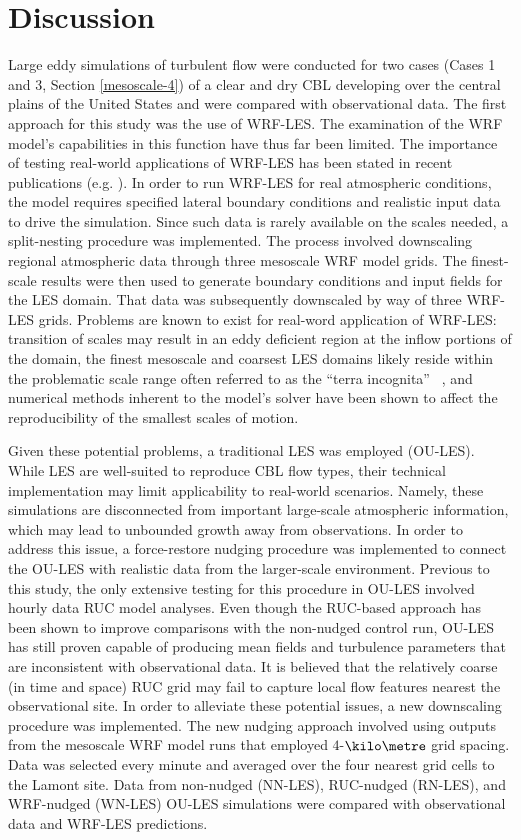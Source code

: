 \section{Discussion}
\label{dis-64}

Large eddy simulations of turbulent flow were conducted for two cases (Cases 1 and 3, Section \autoref{mesoscale-4}) of a clear and dry CBL developing over the central plains of the United States and were compared with observational data. The first approach for this study was the use of WRF-LES. The examination of the WRF model's capabilities in this function have thus far been limited. The importance of testing real-world applications of WRF-LES has been stated in recent publications (e.g. \citealt{Talbot2012}). In order to run WRF-LES for real atmospheric conditions, the model requires specified lateral boundary conditions and realistic input data to drive the simulation. Since such data is rarely available on the scales needed, a split-nesting procedure was implemented. The process involved downscaling regional atmospheric data through three mesoscale WRF model grids. The finest-scale results were then used to generate boundary conditions and input fields for the LES domain. That data was subsequently downscaled by way of three WRF-LES grids. Problems are known to exist for real-word application of WRF-LES: transition of scales may result in an eddy deficient region at the inflow portions of the domain, the finest mesoscale and coarsest LES domains likely reside within the problematic scale range often referred to as the ``terra incognita'' ~\citep{Wyngaard2004}, and numerical methods inherent to the model's solver have been shown to affect the reproducibility of the smallest scales of motion.

Given these potential problems, a traditional LES was employed (OU-LES). While LES are well-suited to reproduce CBL flow types, their technical implementation may limit applicability to real-world scenarios. Namely, these simulations are disconnected from important large-scale atmospheric information, which may lead to unbounded growth away from observations. In order to address this issue, a force-restore nudging procedure was implemented to connect the OU-LES with realistic data from the larger-scale environment. Previous to this study, the only extensive testing for this procedure in OU-LES involved hourly data RUC model analyses. Even though the RUC-based approach has been shown to improve comparisons with the non-nudged control run, OU-LES has still proven capable of producing mean fields and turbulence parameters that are inconsistent with observational data. It is believed that the relatively coarse (in time and space) RUC grid may fail to capture local flow features nearest the observational site. In order to alleviate these potential issues, a new downscaling procedure was implemented. The new nudging approach involved using outputs from the mesoscale WRF model runs that employed $4$-$\kilo\metre$ grid spacing. Data was selected every minute and averaged over the four nearest grid cells to the Lamont site. Data from non-nudged (NN-LES), RUC-nudged (RN-LES), and WRF-nudged (WN-LES) OU-LES simulations were compared with observational data and WRF-LES predictions. 

